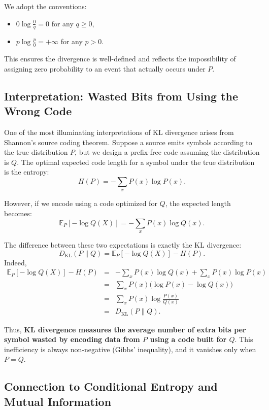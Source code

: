\documentclass[11pt]{article}
\begin{document}
We adopt the conventions:
\begin{itemize}
\item \( 0 \log \frac{0}{q} = 0 \) for any \( q \geq 0 \),
    \item \( p \log \frac{p}{0} = +\infty \) for any \( p > 0 \).
\end{itemize}

This ensures the divergence is well-defined and reflects the impossibility of assigning zero probability to an event that actually occurs under \( P \).

\subsection{Interpretation: Wasted Bits from Using the Wrong Code}

One of the most illuminating interpretations of KL divergence arises from Shannon’s source coding theorem. Suppose a source emits symbols according to the true distribution \( P \), but we design a prefix-free code assuming the distribution is \( Q \). The optimal expected code length for a symbol under the true distribution is the entropy:
\[
H(P) = -\sum_{x} P(x) \log P(x).
\]

However, if we encode using a code optimized for \( Q \), the expected length becomes:
\[
\mathbb{E}_P[-\log Q(X)] = -\sum_{x} P(x) \log Q(x).
\]

The difference between these two expectations is exactly the KL divergence:
\[
D_{\mathrm{KL}}(P \parallel Q) = \mathbb{E}_P[-\log Q(X)] - H(P).
\]
Indeed,
\begin{eqnarray*}
\mathbb{E}_P[-\log Q(X)] - H(P) 
&=& -\sum_x P(x) \log Q(x) + \sum_x P(x) \log P(x) \\
&=& \sum_x P(x) \bigl( \log P(x) - \log Q(x) \bigr) \\
&=& \sum_x P(x) \log \frac{P(x)}{Q(x)} \\
&=& D_{\mathrm{KL}}(P \parallel Q).
\end{eqnarray*}

Thus, \textbf{KL divergence measures the average number of extra bits per symbol wasted by encoding data from \( P \) using a code built for \( Q \)}. This inefficiency is always non-negative (Gibbs’ inequality), and it vanishes only when \( P = Q \).


\subsection{Connection to Conditional Entropy and Mutual Information}
\end{document}
